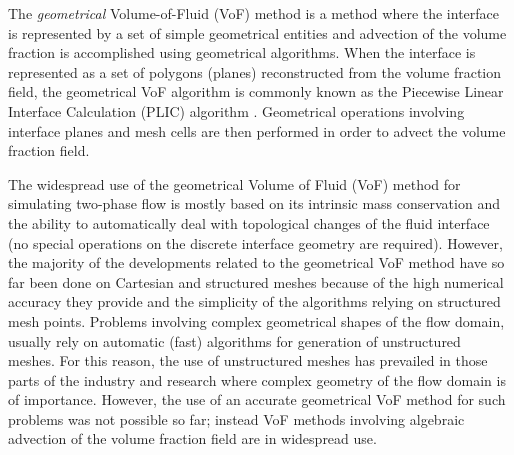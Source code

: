 The \emph{geometrical} Volume-of-Fluid (VoF) method is a method where the 
interface is represented by a set of simple geometrical entities and advection 
of the volume fraction is accomplished using geometrical algorithms. When
the interface is represented as a set of polygons (planes) reconstructed  from
the volume fraction field, the geometrical VoF algorithm is commonly known as
the Piecewise Linear Interface Calculation (PLIC) algorithm \citep{deBarPLIC,
RiderReconstructing1998}. Geometrical operations involving interface planes and
mesh cells are then performed in order to advect the volume fraction field.

The widespread use of the geometrical Volume of Fluid (VoF) method for
simulating two-phase flow is mostly based on its intrinsic mass conservation 
and the ability to automatically deal with topological changes of the fluid 
interface (no special operations on the discrete interface geometry are required). 
However, the majority of the developments related to the geometrical VoF method 
have so far been done on Cartesian and structured meshes because of the high 
numerical accuracy they provide and the simplicity of the algorithms relying 
on structured mesh points. Problems involving complex geometrical shapes of the 
flow domain, usually rely on automatic (fast) algorithms for generation of 
unstructured meshes. For this reason, the use of unstructured meshes has prevailed 
in those parts of the industry and research where complex geometry of the flow 
domain is of importance. However, the use of an accurate geometrical VoF method 
for such problems was not possible so far; instead VoF methods involving algebraic 
advection of the volume fraction field are in widespread use. 

